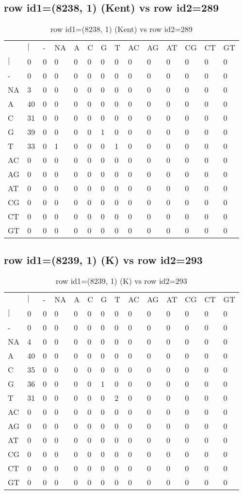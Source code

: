 \subsection{row id1=(8238, 1) (Kent) vs row id2=289}
\begin{center}
\begin{longtable}{|l|l|l|l|l|l|l|l|l|l|l|l|l|l|}
\caption{row id1=(8238, 1) (Kent) vs row id2=289} \label{table_dm362}\\
\hline
\\
\hline
&$|$&-&NA&A&C&G&T&AC&AG&AT&CG&CT&GT\\
$|$&0&0&0&0&0&0&0&0&0&0&0&0&0\\
-&0&0&0&0&0&0&0&0&0&0&0&0&0\\
NA&3&0&0&0&0&0&0&0&0&0&0&0&0\\
A&40&0&0&0&0&0&0&0&0&0&0&0&0\\
C&31&0&0&0&0&0&0&0&0&0&0&0&0\\
G&39&0&0&0&0&1&0&0&0&0&0&0&0\\
T&33&0&1&0&0&0&1&0&0&0&0&0&0\\
AC&0&0&0&0&0&0&0&0&0&0&0&0&0\\
AG&0&0&0&0&0&0&0&0&0&0&0&0&0\\
AT&0&0&0&0&0&0&0&0&0&0&0&0&0\\
CG&0&0&0&0&0&0&0&0&0&0&0&0&0\\
CT&0&0&0&0&0&0&0&0&0&0&0&0&0\\
GT&0&0&0&0&0&0&0&0&0&0&0&0&0\\
\hline
\end{longtable}
\end{center}

\subsection{row id1=(8239, 1) (K) vs row id2=293}
\begin{center}
\begin{longtable}{|l|l|l|l|l|l|l|l|l|l|l|l|l|l|}
\caption{row id1=(8239, 1) (K) vs row id2=293} \label{table_dm364}\\
\hline
\\
\hline
&$|$&-&NA&A&C&G&T&AC&AG&AT&CG&CT&GT\\
$|$&0&0&0&0&0&0&0&0&0&0&0&0&0\\
-&0&0&0&0&0&0&0&0&0&0&0&0&0\\
NA&4&0&0&0&0&0&0&0&0&0&0&0&0\\
A&40&0&0&0&0&0&0&0&0&0&0&0&0\\
C&35&0&0&0&0&0&0&0&0&0&0&0&0\\
G&36&0&0&0&0&1&0&0&0&0&0&0&0\\
T&31&0&0&0&0&0&2&0&0&0&0&0&0\\
AC&0&0&0&0&0&0&0&0&0&0&0&0&0\\
AG&0&0&0&0&0&0&0&0&0&0&0&0&0\\
AT&0&0&0&0&0&0&0&0&0&0&0&0&0\\
CG&0&0&0&0&0&0&0&0&0&0&0&0&0\\
CT&0&0&0&0&0&0&0&0&0&0&0&0&0\\
GT&0&0&0&0&0&0&0&0&0&0&0&0&0\\
\hline
\end{longtable}
\end{center}

